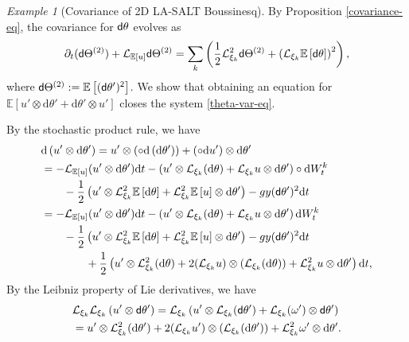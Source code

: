 \documentclass[11pt, oneside]{article}   	%
\numberwithin{equation}{section}
\theoremstyle{plain}
\theoremstyle{definition}
\theoremstyle{remark}
\newtheorem{example}{Example}
\newcommand{\<}{\langle}
\renewcommand{\>}{\rangle}
\def\diff{\textnormal{d}}
\def\rmd{{\mathrm{d}}}
\newcommand{\E}[1]{\mathbb{E}\left[{#1}\right]}
\begin{document}
\begin{example}[Covariance of 2D LA-SALT Boussinesq]
By Proposition \ref{covariance-eq}, the covariance for $\sf{d}\theta$ evolves as
\begin{align}
    \partial_{t}({\sf{d}}\Theta^{(2)})+ \mathcal L_{\E{u}}{\sf{d}}\Theta^{(2)} = \displaystyle\sum_k \left(\frac12 \mathcal L_{\xi_k}^2 {\sf{d}}\Theta^{(2)} + \left(\mathcal L_{\xi_k} \E{{\sf{d}}\theta}\right)^2\right),\label{d-theta-var-eq}
\end{align}
where ${\sf{d}}\Theta^{(2)} := \E{(\sf{d}\theta')^2}$. We show that obtaining an equation for $\E{u' \otimes {\rmd} \theta' + {\rmd} \theta' \otimes u'}$ closes the system \eqref{theta-var-eq}.

By the stochastic product rule, we have
\begin{align}
    &\diff \,(u' \otimes {\rmd}\theta') = u' \otimes (\circ \diff \,({\rmd} \theta')) + (\circ \diff u') \otimes {\rmd} \theta'\nonumber \\
    &=-\mathcal L_{\E{u}}(u' \otimes {\rmd}\theta') \diff t - \left(u'\otimes \mathcal L_{\xi_k}({\rmd}\theta) + \mathcal L_{\xi_k} u \otimes {\rmd}\theta'\right)\circ \diff W_t^k \nonumber\\
    &\qquad - \frac12 \left(u' \otimes \mathcal L_{\xi_k}^2 \E{{\rmd}\theta} + \mathcal L_{\xi_k}^2 \E{u} \otimes {\rmd}\theta'\right) - gy ({\sf{d}}\theta')^2\diff t \nonumber\\
    &=-\mathcal L_{\E{u}}(u' \otimes {\rmd}\theta') \diff t - \left(u'\otimes \mathcal L_{\xi_k}({\rmd}\theta) + \mathcal L_{\xi_k} u \otimes {\rmd}\theta'\right) \diff W_t^k \nonumber\\
    &\qquad - \frac12 \left(u' \otimes \mathcal L_{\xi_k}^2 \E{{\rmd}\theta} + \mathcal L_{\xi_k}^2 \E{u} \otimes {\rmd}\theta'\right) - gy ({\sf{d}}\theta')^2\diff t \nonumber \\
    &\qquad \qquad + \frac12 \left(u' \otimes \mathcal L_{\xi_k}^2 ({\rmd} \theta) + 2(\mathcal L_{\xi_k} u) \otimes \left(\mathcal L_{\xi_k} ({\rmd} \theta)\right) + \mathcal L_{\xi_k}^2 u \otimes {\rmd} \theta'\right) \diff t, \label{omega-theta-prime}
\end{align}
By the Leibniz property of Lie derivatives, we have
\begin{align*}
    &\mathcal L_{\xi_k} \mathcal L_{\xi_k} \left(u' \otimes {\sf{d}}\theta'\right) = \mathcal L_{\xi_k} \left(u' \otimes \mathcal L_{\xi_k}({\sf{d}}\theta') +\mathcal L_{\xi_k}(\omega') \otimes {\sf{d}}\theta'\right) \\
    &= u' \otimes \mathcal L_{\xi_k}^2 ({\rmd} \theta') + 2(\mathcal L_{\xi_k} u') \otimes \left(\mathcal L_{\xi_k} ({\rmd} \theta')\right) + \mathcal L_{\xi_k}^2 \omega' \otimes {\rmd} \theta'.
\end{align*}


\end{example}
\end{document}
